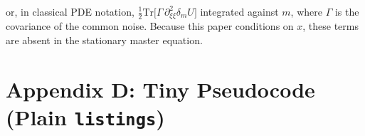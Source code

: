 ﻿\documentclass[11pt,letterpaper,oneside]{article}
\numberwithin{equation}{section}
\newcommand{\1}{\mathbf{1}}
\newcommand{\dmU}{\delta_m U}
\begin{document}
or, in classical PDE notation,
$\tfrac12 \mathrm{Tr}\big[\Gamma\,\partial_{\xi\xi}^2 \dmU\big]$
integrated against $m$, where $\Gamma$ is the covariance of the common noise. Because this paper conditions on $x$, these terms are absent in the stationary master equation.

\section{Appendix D: Tiny Pseudocode (Plain \texorpdfstring{\texttt{listings}}{listings})}\label{app:code}

\lstset{
basicstyle=\ttfamily\small,
columns=fullflexible,
showstringspaces=false,
frame=single,
framerule=0.4pt,
breaklines=true,
tabsize=2,
captionpos=b
}
\end{document}
